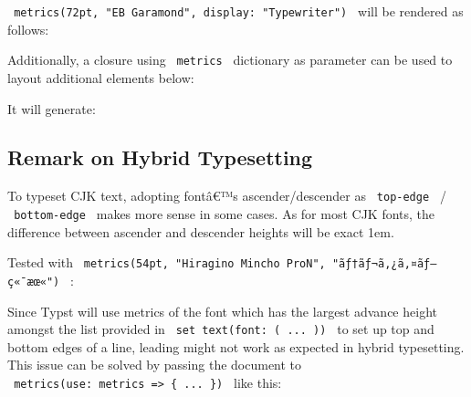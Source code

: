 \texttt{\ metrics(72pt,\ "EB\ Garamond",\ display:\ "Typewriter")\ }
will be rendered as follows:

\pandocbounded{}

Additionally, a closure using \texttt{\ metrics\ } dictionary as
parameter can be used to layout additional elements below:

\begin{Shaded}
\begin{Highlighting}[]
\NormalTok{  )}
\NormalTok{)}
\end{Highlighting}
\end{Shaded}

It will generate:

\pandocbounded{}

\subsection{Remark on Hybrid
Typesetting}\label{remark-on-hybrid-typesetting}

To typeset CJK text, adopting fontâ€™s ascender/descender as
\texttt{\ top-edge\ } / \texttt{\ bottom-edge\ } makes more sense in
some cases. As for most CJK fonts, the difference between ascender and
descender heights will be exact 1em.

Tested with
\texttt{\ metrics(54pt,\ "Hiragino\ Mincho\ ProN",\ "ãƒ†ãƒ¬ã‚¿ã‚¤ãƒ—ç«¯æœ«")\ }
:

\pandocbounded{}

Since Typst will use metrics of the font which has the largest advance
height amongst the list provided in
\texttt{\ set\ text(font:\ (\ ...\ ))\ } to set up top and bottom edges
of a line, leading might not work as expected in hybrid typesetting.
This issue can be solved by passing the document to
\texttt{\ metrics(use:\ metrics\ =\textgreater{}\ \{\ ...\ \})\ } like
this:

